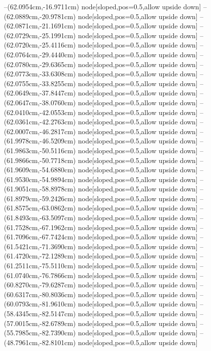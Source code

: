 --(62.0954cm,-16.9711cm) node[sloped,pos=0.5,allow upside down]{\arrowIn}
--(62.0889cm,-20.9781cm) node[sloped,pos=0.5,allow upside down]{\ArrowIn}
--(62.0871cm,-21.1691cm) node[sloped,pos=0.5,allow upside down]{\arrowIn}
--(62.0729cm,-25.1991cm) node[sloped,pos=0.5,allow upside down]{\ArrowIn}
--(62.0720cm,-25.4116cm) node[sloped,pos=0.5,allow upside down]{\arrowIn}
--(62.0764cm,-29.4440cm) node[sloped,pos=0.5,allow upside down]{\ArrowIn}
--(62.0780cm,-29.6365cm) node[sloped,pos=0.5,allow upside down]{\arrowIn}
--(62.0773cm,-33.6308cm) node[sloped,pos=0.5,allow upside down]{\ArrowIn}
--(62.0755cm,-33.8255cm) node[sloped,pos=0.5,allow upside down]{\arrowIn}
--(62.0649cm,-37.8447cm) node[sloped,pos=0.5,allow upside down]{\ArrowIn}
--(62.0647cm,-38.0760cm) node[sloped,pos=0.5,allow upside down]{\arrowIn}
--(62.0410cm,-42.0553cm) node[sloped,pos=0.5,allow upside down]{\ArrowIn}
--(62.0361cm,-42.2763cm) node[sloped,pos=0.5,allow upside down]{\arrowIn}
--(62.0007cm,-46.2817cm) node[sloped,pos=0.5,allow upside down]{\ArrowIn}
--(61.9978cm,-46.5209cm) node[sloped,pos=0.5,allow upside down]{\arrowIn}
--(61.9863cm,-50.5116cm) node[sloped,pos=0.5,allow upside down]{\ArrowIn}
--(61.9866cm,-50.7718cm) node[sloped,pos=0.5,allow upside down]{\arrowIn}
--(61.9609cm,-54.6880cm) node[sloped,pos=0.5,allow upside down]{\ArrowIn}
--(61.9530cm,-54.9894cm) node[sloped,pos=0.5,allow upside down]{\arrowIn}
--(61.9051cm,-58.8978cm) node[sloped,pos=0.5,allow upside down]{\ArrowIn}
--(61.8979cm,-59.2426cm) node[sloped,pos=0.5,allow upside down]{\arrowIn}
--(61.8575cm,-63.0862cm) node[sloped,pos=0.5,allow upside down]{\ArrowIn}
--(61.8493cm,-63.5097cm) node[sloped,pos=0.5,allow upside down]{\arrowIn}
--(61.7528cm,-67.1962cm) node[sloped,pos=0.5,allow upside down]{\ArrowIn}
--(61.7096cm,-67.7424cm) node[sloped,pos=0.5,allow upside down]{\arrowIn}
--(61.5421cm,-71.3690cm) node[sloped,pos=0.5,allow upside down]{\ArrowIn}
--(61.4720cm,-72.1289cm) node[sloped,pos=0.5,allow upside down]{\arrowIn}
--(61.2511cm,-75.5110cm) node[sloped,pos=0.5,allow upside down]{\ArrowIn}
--(61.0740cm,-76.7866cm) node[sloped,pos=0.5,allow upside down]{\ArrowIn}
--(60.8270cm,-79.6287cm) node[sloped,pos=0.5,allow upside down]{\ArrowIn}
--(60.6317cm,-80.8036cm) node[sloped,pos=0.5,allow upside down]{\ArrowIn}
--(60.0793cm,-81.9610cm) node[sloped,pos=0.5,allow upside down]{\ArrowIn}
--(58.4345cm,-82.5147cm) node[sloped,pos=0.5,allow upside down]{\ArrowIn}
--(57.0015cm,-82.6789cm) node[sloped,pos=0.5,allow upside down]{\ArrowIn}
--(55.7985cm,-82.7390cm) node[sloped,pos=0.5,allow upside down]{\ArrowIn}
--(48.7961cm,-82.8101cm) node[sloped,pos=0.5,allow upside down]{\ArrowIn}
